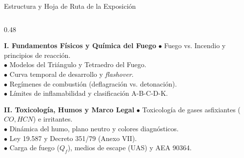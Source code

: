 \begin{frame}[plain]
  \titlepage
\end{frame}

\begin{frame}{Estructura y Hoja de Ruta de la Exposición}
  \begin{columns}[T]
    \begin{column}{0.48\textwidth}
      \begin{block}{\textbf{I. Fundamentos Físicos y Química del Fuego}}
        \scriptsize
        $\bullet$ Fuego vs. Incendio y principios de reacción.\\
        $\bullet$ Modelos del Triángulo y Tetraedro del Fuego.\\
        $\bullet$ Curva temporal de desarrollo y \textit{flashover}.\\
        $\bullet$ Regímenes de combustión (deflagración vs. detonación).\\
        $\bullet$ Límites de inflamabilidad y clasificación A-B-C-D-K.
      \end{block}
      \vspace{0.2cm}
      \begin{block}{\textbf{II. Toxicología, Humos y Marco Legal}}
        \scriptsize
        $\bullet$ Toxicología de gases asfixiantes ($CO, HCN$) e irritantes.\\
        $\bullet$ Dinámica del humo, plano neutro y colores diagnósticos.\\
        $\bullet$ Ley 19.587 y Decreto 351/79 (Anexo VII).\\
        $\bullet$ Carga de fuego ($Q_f$), medios de escape (UAS) y AEA 90364.
      \end{block}
    \end{column}


\end{columns}
\end{frame}
